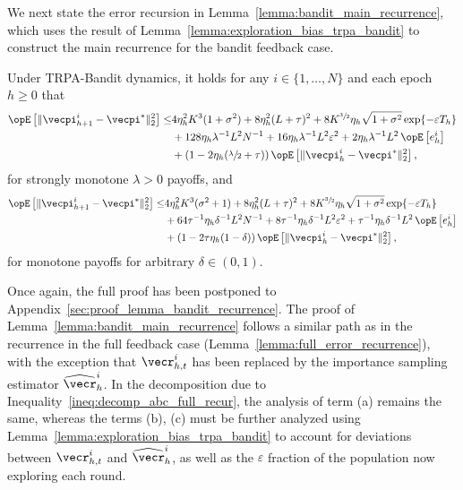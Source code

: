 We next state the error recursion in Lemma~\ref{lemma:bandit_main_recurrence}, which uses the result of Lemma~\ref{lemma:exploration_bias_trpa_bandit} to construct the main recurrence for the bandit feedback case.

\begin{lemma}\label{lemma:bandit_main_recurrence}
Under TRPA-Bandit dynamics, it holds for any $i \in \{1, \ldots, N \}$ and each epoch $h\geq 0$ that
\begin{align*}
    \Exop\left[\| \vecpi_{h+1}^i - \vecpi^* \|_2^2\right] \leq & 4 \eta_h^2 K^3(1 + \sigma^2) + 8\eta_h^2(L+\tau)^2 + 8 K^{\sfrac{3}{2}}\eta_h \sqrt{1+\sigma^2}  \exp\{-\varepsilon T_h\} \\
        &+128\eta_h\lambda^{-1} L^2 N^{-1} + 16\eta_h\lambda^{-1}L^2\varepsilon^2 + 2\eta_h\lambda^{-1} L^2 \Exop\left[e_h^i\right] \\
        &+\left(1 - 2 \eta_h(\sfrac{\lambda}{2} + \tau)\right) \Exop\left[\| \vecpi_h^i - \vecpi^* \|_2^2\right],
\end{align*}
for strongly monotone $\lambda >0$ payoffs, and
\begin{align*}
    \Exop\left[\| \vecpi_{h+1}^i - \vecpi^* \|_2^2\right] \leq &  4\eta_h^2 K^3(\sigma^2 + 1) + 8 \eta_h^2 (L+\tau)^2 + 8 K^{\sfrac{3}{2}} \eta_h \sqrt{1+\sigma^2} \exp\{-\varepsilon T_h\} \\
    &+64\tau^{-1} \eta_h \delta^{-1}L^2 N^{-1}+8\tau^{-1} \eta_h \delta^{-1}L^2 \varepsilon^{2} + \tau^{-1} \eta_h\delta^{-1}L^2 \Exop\left[e_h^i\right] \\  
        &+ \left(1 - 2 \tau \eta_h (1-\delta)\right) \Exop\left[\| \vecpi_h^i - \vecpi^* \|_2^2\right],
\end{align*}
for monotone payoffs for arbitrary $\delta \in (0,1)$.
\end{lemma}
Once again, the full proof has been postponed to Appendix~\ref{sec:proof_lemma_bandit_recurrence}.
The proof of Lemma~\ref{lemma:bandit_main_recurrence} follows a similar path as in the recurrence in the full feedback case (Lemma~\ref{lemma:full_error_recurrence}), with the exception that $\vecr_{h,t}^i$ has been replaced by the importance sampling estimator $\widehat{\vecr}^i_h$.
In the decomposition due to Inequality~\eqref{ineq:decomp_abc_full_recur}, the analysis of term (a) remains the same, whereas the terms (b), (c) must be further analyzed using Lemma~\ref{lemma:exploration_bias_trpa_bandit} to account for deviations between $\vecr_{h,t}^i$ and $\widehat{\vecr}^i_h$, as well as the $\varepsilon$ fraction of the population now exploring each round.

